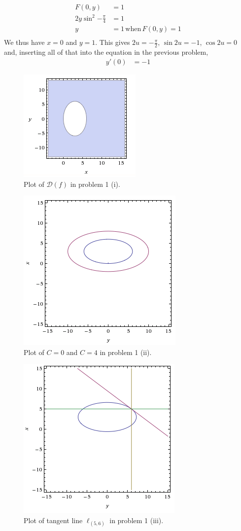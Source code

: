 \documentclass[a4paper,norsk,12pt]{article}
\begin{document}
\begin{align*}
  F(0,y) &= 1 \\
  2y\sin^2{-\frac{\pi}{4}} &= 1\\
  y &= 1 \,\text{when}\, F(0,y)=1\\
\end{align*}
We thus have $x=0$ and $y=1$. This gives $2u = -\frac{\pi}{2}$, $\sin{2u} =
-1$, $\cos{2u} = 0$ and, inserting all of that into the equation in the
previous problem,
\begin{align*}
  y'(0) &= -1
\end{align*}

\begin{figure}[h]
  \centering
  \includegraphics{ob1plot.png}
  \caption{Plot of $\mathcal{D}(f)$ in problem 1 (i).}
  \label{plot.p1}
\end{figure}

\begin{figure}[h]
  \centering
  \includegraphics{ob1plot2.png}
  \caption{Plot of $C=0$ and $C=4$ in problem 1 (ii).}
  \label{plot.p2}
\end{figure}

\begin{figure}[h]
  \centering
  \includegraphics{ob1plot3.png}
  \caption{Plot of tangent line $\ell_{(5,6)}$ in problem 1 (iii).}
  \label{plot.p3}
\end{figure}
\end{document}
